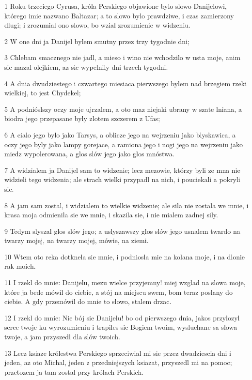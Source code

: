 \par 1 Roku trzeciego Cyrusa, króla Perskiego objawione bylo slowo Danijelowi, którego imie nazwano Baltazar; a to slowo bylo prawdziwe, i czas zamierzony dlugi; i zrozumial ono slowo, bo wzial zrozumienie w widzeniu.
\par 2 W one dni ja Danijel bylem smutny przez trzy tygodnie dni;
\par 3 Chlebam smacznego nie jadl, a mieso i wino nie wchodzilo w usta moje, anim sie mazal olejkiem, az sie wypelnily dni trzech tygodni.
\par 4 A dnia dwudziestego i czwartego miesiaca pierwszego bylem nad brzegiem rzeki wielkiej, to jest Chydekel;
\par 5 A podnióslszy oczy moje ujrzalem, a oto maz niejaki ubrany w szate lniana, a biodra jego przepasane byly zlotem szczerem z Ufas;
\par 6 A cialo jego bylo jako Tarsys, a oblicze jego na wejrzeniu jako blyskawica, a oczy jego byly jako lampy gorejace, a ramiona jego i nogi jego na wejrzeniu jako miedz wypolerowana, a glos slów jego jako glos mnóstwa.
\par 7 A widzialem ja Danijel sam to widzenie; lecz mezowie, którzy byli ze mna nie widzieli tego widzenia; ale strach wielki przypadl na nich, i pouciekali a pokryli sie.
\par 8 A jam sam zostal, i widzialem to wielkie widzenie; ale sila nie zostala we mnie, i krasa moja odmienila sie we mnie, i skazila sie, i nie mialem zadnej sily.
\par 9 Tedym slyszal glos slów jego; a uslyszawszy glos slów jego usnalem twardo na twarzy mojej, na twarzy mojej, mówie, na ziemi.
\par 10 Wtem oto reka dotknela sie mnie, i podniosla mie na kolana moje, i na dlonie rak moich.
\par 11 I rzekl do mnie: Danijelu, mezu wielce przyjemny! miej wzglad na slowa moje, które ja bede mówil do ciebie, a stój na miejscu swem, bom teraz poslany do ciebie. A gdy przemówil do mnie to slowo, stalem drzac.
\par 12 I rzekl do mnie: Nie bój sie Danijelu! bo od pierwszego dnia, jakos przylozyl serce twoje ku wyrozumieniu i trapiles sie Bogiem twoim, wysluchane sa slowa twoje, a jam przyszedl dla slów twoich.
\par 13 Lecz ksiaze królestwa Perskiego sprzeciwial mi sie przez dwadziescia dni i jeden, az oto Michal, jeden z przedniejszych ksiazat, przyszedl mi na pomoc; przetozem ja tam zostal przy królach Perskich.

